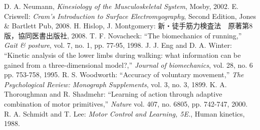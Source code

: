 \begin{thebibliography}{99}
 D. A. Neumann, {\it Kinesiology of the Musculoskeletal System}, Mosby, 2002.
 E. Criswell: {\it Cram's Introduction to Surface Electromyography}, Second Edition, Jones \& Bartlett Pub, 2008.
 H. Hislop, J. Montgomery: 新・徒手筋力検査法　原著第8版，協同医書出版社, 2008.
 T. F. Novacheck: ``The biomechanics of running,'' {\it Gait \& posture}, vol. 7, no. 1, pp. 77-95, 1998.
 J. J. Eng and D. A. Winter: ``Kinetic analysis of the lower limbs during walking: what information can be gained from a three-dimensional model?,'' {\it Journal of biomechanics}, vol. 28, no. 6 pp. 753-758, 1995.
 R. S. Woodworth: ``Accuracy of voluntary movement,'' {\it The Psychological Review: Monograph Supplements}, vol. 3, no. 3, 1899.
 K. A. Thoroughman and R. Shadmehr: ``Learning of action through adaptive combination of motor primitives,'' {\it Nature} vol. 407, no. 6805, pp. 742-747, 2000.
 R. A. Schmidt and T. Lee: {\it Motor Control and Learning, 5E.}, Human kinetics, 1988.

\end{thebibliography}
\normalsize
